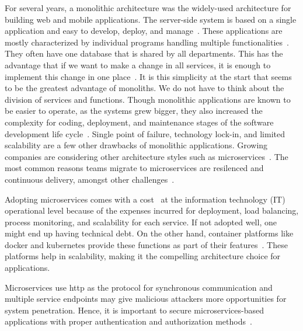 \par For several years, a monolithic architecture was the widely-used architecture for building web and mobile applications. The server-side system is based on a single application and easy to develop, deploy, and manage~\cite{Danbettinger2019}. These applications are mostly characterized by individual programs handling multiple functionalities~\cite{Francesco2019}. They often have one database that is shared by all departments. This has the advantage that if we want to make a change in all services, it is enough to implement this change in one place~\cite{Pavlovic2020}. It is this simplicity at the start that seems to be the greatest advantage of monoliths. We do not have to think about the division of services and functions. Though monolithic applications are known to be easier to operate, as the systems grew bigger, they also increased the complexity for coding, deployment, and maintenance stages of the software development life cycle~\cite{Kalske2017, Santos2020}. Single point of failure, technology lock-in, and limited scalability are a few other drawbacks of monolithic applications. Growing companies are considering other architecture styles such as microservices~\cite{Lenga2019, Jag2017, Rodrigue2016}. The most common reasons teams migrate to microservices are resilenced and continuous delivery, amongst other challenges~\cite{haugeland2020}.


\par Adopting microservices comes with a cost~\cite{villamizar2017} at the information technology (IT) operational level because of the expenses incurred for deployment, load balancing, process monitoring, and scalability for each service. If not adopted well, one might end up having technical debt. On the other hand, container platforms like docker and kubernetes provide these functions as part of their features~\cite{Sharaf2019, Venugopal2017}. These platforms help in scalability, making it the compelling architecture choice for applications.

\par Microservices use http as the protocol for synchronous communication and multiple service endpoints may give malicious attackers more opportunities for system penetration. Hence, it is important to secure microservices-based applications with proper authentication and authorization methods~\cite{Jaleel2017, Dragoni2017}.


